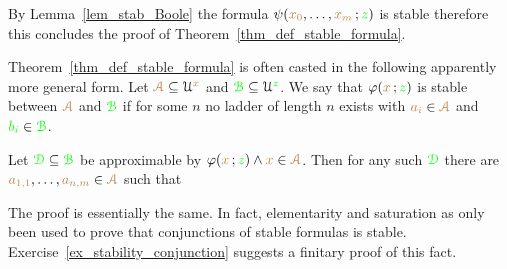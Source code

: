 






By Lemma~\ref{lem_stab_Boole} the formula $\psi({\color{brown} x_0},\dots,{\color{brown} x_m}\,;{\color{green} z})$ is stable therefore this concludes the proof of Theorem~\ref{thm_def_stable_formula}. 

\begin{remark}\label{rem_sability_no_compactness}
  Theorem~\ref{thm_def_stable_formula} is often casted in the following  apparently more general form.
  Let ${\color{brown}\EuScript A}\subseteq\EuScript U^{\color{brown} x}$ and ${\color{green}\EuScript B}\subseteq\EuScript U^{\color{green} z}$.
  We say that $\varphi({\color{brown} x}\,;{\color{green} z})$ is stable between ${\color{brown}\EuScript A}$ and ${\color{green}\EuScript B}$ if for some $n$ no ladder of length $n$ exists with ${\color{brown} a_i}\in{\color{brown}\EuScript A}$ and ${\color{green} b_i}\in{\color{green}\EuScript B}$.

  Let ${\color{green}\EuScript D}\subseteq{\color{green}\EuScript B}$ be approximable by $\varphi({\color{brown} x}\,;{\color{green} z})\wedge {\color{brown}x}\in{\color{brown}\EuScript A}$.
  Then for any such ${\color{green}\EuScript D}$ there are ${\color{brown} a_{1,1}},\dots,{\color{brown} a_{n,m}}\in {\color{brown}\EuScript A}$ such that 
  
  
  The proof is essentially the same. 
  In fact, elementarity and saturation as only been used to prove that conjunctions of stable formulas is stable.
  Exercise~\ref{ex_stability_conjunction} suggests a finitary proof of this fact.
\end{remark} 

